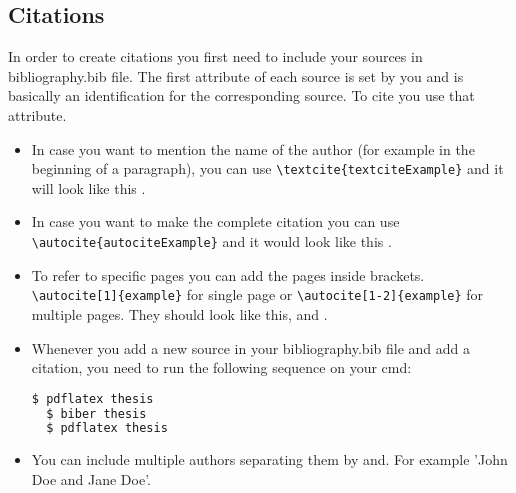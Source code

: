 \subsection{Citations}
\label{citations}
In order to create citations you first need to include your sources in bibliography.bib file. The first attribute of each source is set by you and is basically an identification for the corresponding source. To cite you use that attribute. 
\begin{itemize}
\item In case you want to mention the name of the author (for example in the beginning of a paragraph), you can use \verb|\textcite{textciteExample}| and it will look like this \textcite{bookExample}. 
\item In case you want to make the complete citation you can use \verb|\autocite{autociteExample}| and it would look like this \autocite{articleExample}.
\item To refer to specific pages you can add the pages inside brackets. \verb|\autocite[1]{example}| for single page or \verb|\autocite[1-2]{example}| for multiple pages. They should look like this, \autocite[1]{articleExample} and \autocite[1-2]{bookExample}.
\item Whenever you add a new source in your bibliography.bib file and add a citation, you need to run the following sequence on your cmd: \\
\begin{lstlisting}[language=bash]
  $ pdflatex thesis
  $ biber thesis
  $ pdflatex thesis
\end{lstlisting}
\item You can include multiple authors separating them by and. For example 'John Doe and Jane Doe'.
\end{itemize}

